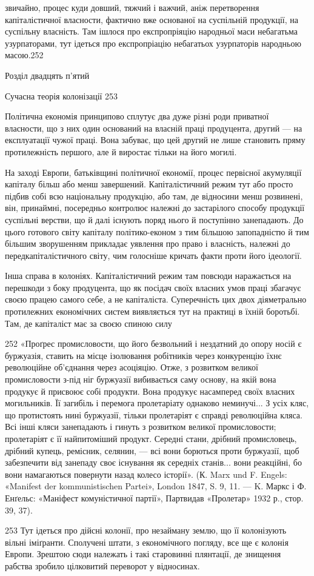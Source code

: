 звичайно, процес куди довший, тяжчий і важчий, аніж перетворення
капіталістичної власности, фактично вже основаної на суспільній
продукції, на суспільну власність. Там ішлося про експропріяцію
народньої маси небагатьма узурпаторами, тут ідеться
про експропріацію небагатьох узурпаторів народньою масою.252

Розділ двадцять п’ятий

Сучасна теорія колонізації 253

Політична економія принципово сплутує два дуже різні
роди приватної власности, що з них один оснований на власній
праці продуцента, другий — на експлуатації чужої праці.
Вона забуває, що цей другий не лише становить пряму протилежність
першого, але й виростає тільки на його могилі.

На заході Европи, батьківщині політичної економії, процес
первісної акумуляції капіталу більш або менш завершений.
Капіталістичний режим тут або просто підбив собі всю національну
продукцію, або там, де відносини менш розвинені, він, принаймні,
посередньо контролює належні до застарілого способу
продукції суспільні верстви, що й далі існують поряд нього й
поступінно занепадають. До цього готового світу капіталу політико-економ
з тим більшою запопадністю й тим більшим
зворушенням прикладає уявлення про право і власність, належні
до передкапіталістичного світу, чим голосніше кричать
факти проти його ідеології.

Інша справа в колоніях. Капіталістичний режим там повсюди
наражається на перешкоди з боку продуцента, що як посідач
своїх власних умов праці збагачує своєю працею самого
себе, а не капіталіста. Суперечність цих двох діяметрально протилежних
економічних систем виявляється тут на практиці
в їхній боротьбі. Там, де капіталіст має за своєю спиною силу

252 «Проґрес промисловости, що його безвольний і нездатний до
опору носій є буржуазія, ставить на місце ізолювання робітників через
конкуренцію їхнє революційне об’єднання через асоціяцію. Отже, з розвитком
великої промисловости з-під ніг буржуазії вибивається саму основу,
на якій вона продукує й присвоює собі продукти. Вона продукує насамперед
своїх власних могильників. Її загибіль і перемога пролетаріату
однаково неминучі... З усіх кляс, що протистоять нині буржуазії, тільки
пролетаріят є справді революційна кляса. Всі інші кляси занепадають і
гинуть з розвитком великої промисловости; пролетаріят є її найпитоміший
продукт. Середні стани, дрібний промисловець, дрібний купець, ремісник,
селянин, — всі вони борються проти буржуазії, щоб забезпечити від
занепаду своє існування як середніх станів... вони реакційні, бо вони
намагаються повернути назад колесо історії». (К. Marx und F. Engels:
«Manifest der kommunistischen Partei», London 1847, S. 9, 11. — K. Маркс
і Ф. Енґельс: «Маніфест комуністичної партії», Партвидав «Пролетар»
1932 р., стор. 39, 37).

253 Тут ідеться про дійсні колонії, про незайману землю, що її колонізують
вільні іміґранти. Сполучені штати, з економічного погляду, все
ще є колонія Европи. Зрештою сюди належать і такі старовинні плянтації,
де знищення рабства зробило цілковитий переворот у відносинах.
